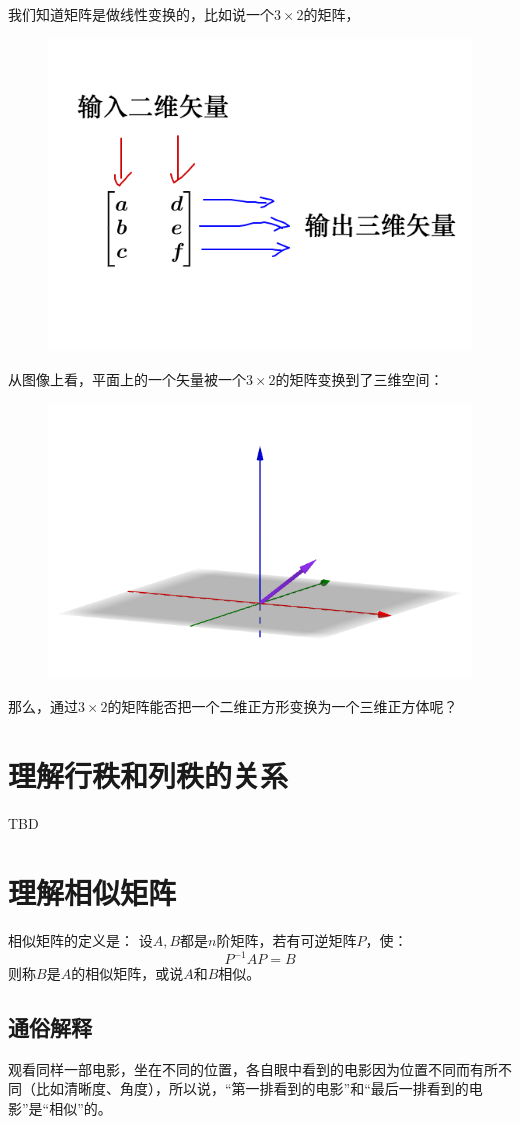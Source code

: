 \documentclass[12pt]{article}
\begin{document}
我们知道矩阵是做线性变换的，比如说一个$3\times2$的矩阵，
\begin{figure}[H]
    \centering
    \includegraphics[width=.5\textwidth]{fig/UnderstandDeterminant_5.png}
\end{figure}  

从图像上看，平面上的一个矢量被一个$3\times2$的矩阵变换到了三维空间：
\begin{figure}[H]
    \centering
    \includegraphics[width=.5\textwidth]{fig/UnderstandDeterminant_6.png}
\end{figure} 

那么，通过$3\times2$的矩阵能否把一个二维正方形变换为一个三维正方体呢？

\section{理解行秩和列秩的关系\cite{Why_Rank_Of_Row_Column_Equal}}
TBD

\section{理解相似矩阵\cite{How_To_Understand_Similar_Matrix}}
相似矩阵的定义是：
设$A,B$都是$n$阶矩阵，若有可逆矩阵$P$，使：
$$
P^{-1}AP=B
$$
则称$B$是$A$的相似矩阵，或说$A$和$B$相似。

\subsection{通俗解释}
观看同样一部电影，坐在不同的位置，各自眼中看到的电影因为位置不同而有所不同（比如清晰度、角度），所以说，“第一排看到的电影”和“最后一排看到的电影”是“相似”的。
\end{document}
